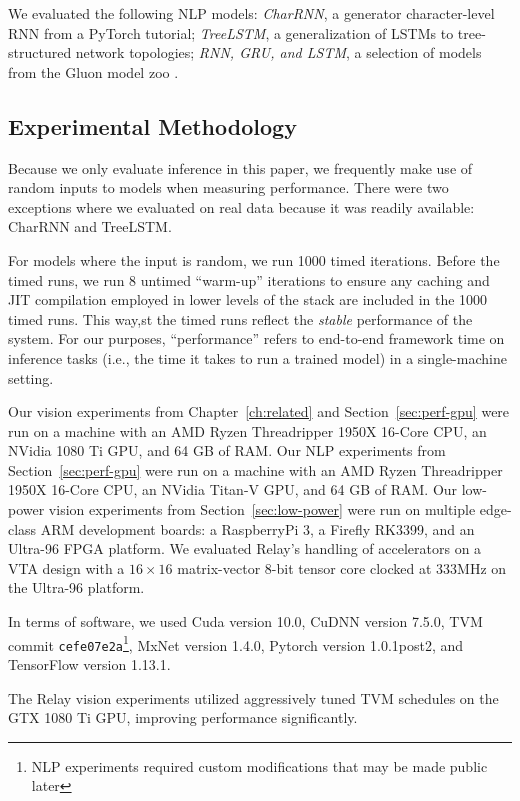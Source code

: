   We evaluated the following NLP models:
    \textit{CharRNN}, a generator character-level
    RNN from a PyTorch tutorial;
    \textit{TreeLSTM}, a generalization of LSTMs to
    tree-structured network topologies;
    \textit{RNN, GRU, and LSTM}, a selection of models from the Gluon
    model zoo
    \citep{pytorch_rnn_tut, tree_lstm, gluon_model_zoo}.

\subsection{Experimental Methodology}
  Because we only evaluate inference in this paper,
    we frequently make use of random inputs to models when measuring
    performance.
  There were two exceptions where we evaluated on real data because
    it was readily available: CharRNN and TreeLSTM.

  For models where the input is random,
    we run 1000 timed iterations.
  Before the timed runs,
    we run 8 untimed ``warm-up'' iterations to ensure any caching and JIT compilation
    employed in lower levels of the stack are included in the 1000 timed runs.
  This way,st
    the timed runs reflect the \textit{stable} performance of the system.
  For our purposes, ``performance'' refers to end-to-end framework time on
    inference tasks (i.e., the time it takes to run a trained model) in a
    single-machine setting.

  Our vision experiments from Chapter~\ref{ch:related} and Section~\ref{sec:perf-gpu} were run on a machine with an AMD Ryzen
    Threadripper 1950X 16-Core CPU,
    an NVidia 1080 Ti GPU,
    and 64 GB of RAM.
  Our NLP experiments from Section~\ref{sec:perf-gpu} were run on a machine with an AMD Ryzen
    Threadripper 1950X 16-Core CPU,
    an NVidia Titan-V GPU,
    and 64 GB of RAM.
  Our low-power vision experiments from Section~\ref{sec:low-power} were run on multiple edge-class ARM development boards: a RaspberryPi 3, a Firefly RK3399, and an Ultra-96 FPGA platform.
  We evaluated Relay's handling of accelerators on a VTA design with a
    $16\times16$ matrix-vector 8-bit tensor core clocked at 333MHz on the Ultra-96 platform.

  In terms of software, we used
    Cuda version 10.0,
    CuDNN version 7.5.0,
    TVM commit \texttt{cefe07e2a}\footnote{NLP experiments required custom modifications that may be made public later},
    MxNet version 1.4.0,
    Pytorch version 1.0.1post2,
    and TensorFlow version 1.13.1.

  The Relay vision experiments utilized aggressively tuned TVM schedules on the GTX 1080 Ti GPU,
    improving performance significantly.

